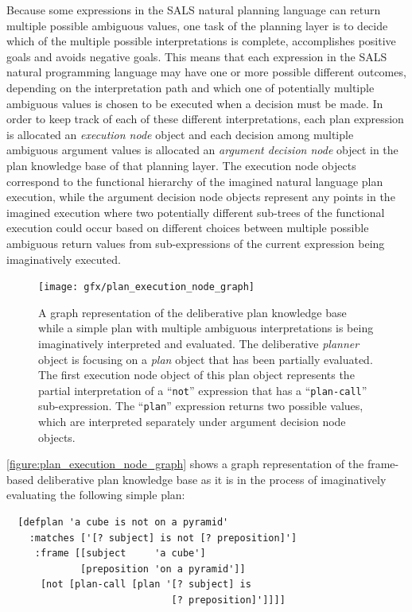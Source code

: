 Because some expressions in the SALS natural planning language can
return multiple possible ambiguous values, one task of the planning
layer is to decide which of the multiple possible interpretations is
complete, accomplishes positive goals and avoids negative goals.  This
means that each expression in the SALS natural programming language
may have one or more possible different outcomes, depending on the
interpretation path and which one of potentially multiple ambiguous
values is chosen to be executed when a decision must be made.  In
order to keep track of each of these different interpretations, each
plan expression is allocated an {\emph{execution node}} object and
each decision among multiple ambiguous argument values is allocated an
{\emph{argument decision node}} object in the plan knowledge base of
that planning layer.  The execution node objects correspond to the
functional hierarchy of the imagined natural language plan execution,
while the argument decision node objects represent any points in the
imagined execution where two potentially different sub-trees of the
functional execution could occur based on different choices between
multiple possible ambiguous return values from sub-expressions of the
current expression being imaginatively executed.
\begin{figure}
\hspace*{-1cm}\texttt{[image: gfx/plan\_execution\_node\_graph]}
\caption[A graph representation of the deliberative plan knowledge
  base while a simple plan with multiple ambiguous interpretations is
  being imaginatively interpreted and evaluated.]{A graph
  representation of the deliberative plan knowledge base while a
  simple plan with multiple ambiguous interpretations is being
  imaginatively interpreted and evaluated.  The deliberative
  {\emph{planner}} object is focusing on a {\emph{plan}} object that
  has been partially evaluated.  The first execution node object of
  this plan object represents the partial interpretation of a
  ``{\tt{not}}'' expression that has a ``{\tt{plan-call}}''
  sub-expression.  The ``{\tt{plan}}'' expression returns two possible
  values, which are interpreted separately under argument decision
  node objects.}
\label{figure:plan_execution_node_graph}
\end{figure}
{\mbox{\autoref{figure:plan_execution_node_graph}}} shows a graph
representation of the frame-based deliberative plan knowledge base as
it is in the process of imaginatively evaluating the following simple
plan:
\begin{samepage}
\begin{Verbatim}
  [defplan 'a cube is not on a pyramid'
    :matches ['[? subject] is not [? preposition]']
     :frame [[subject     'a cube']
             [preposition 'on a pyramid']]
      [not [plan-call [plan '[? subject] is
                             [? preposition]']]]]
\end{Verbatim}
\end{samepage}
